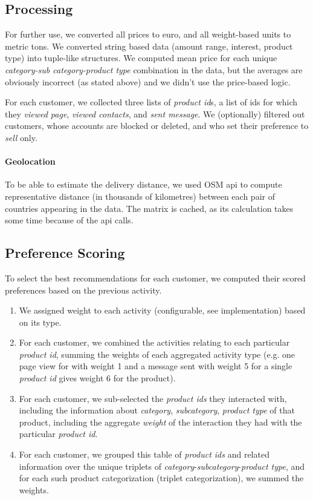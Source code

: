 \documentclass{report}
\begin{document}
\subsection*{Processing}

For further use, we converted all prices to euro, and all weight-based units to metric tons. We converted string
based data (amount range, interest, product type) into tuple-like structures. We computed mean price for each unique
\emph{category-sub category-product type} combination in the data, but the averages are obviously incorrect (as 
stated above) and we didn't use the price-based logic.

For each customer, we collected three lists of \emph{product id}s, a list of ids for which they \emph{viewed page},
\emph{viewed contacts}, and \emph{sent message}. We (optionally) filtered out customers, whose accounts are 
blocked or deleted, and who set their preference to \emph{sell} only.

\paragraph{Geolocation} To be able to estimate the delivery distance, we used OSM api to compute representative 
distance (in thousands of kilometres) between each pair of countries appearing in the data. The matrix is cached,
as its calculation takes some time because of the api calls.

\subsection*{Preference Scoring}

To select the best recommendations for each customer, we computed their scored preferences based on the previous 
activity.

\begin{enumerate}
	\item We assigned weight to each activity (configurable, see implementation) based on its type.
	\item For each customer, we combined the activities relating to each particular \emph{product id}, 
		summing the weights of each aggregated activity type (e.g. one page view for with weight 1 and a 
		message sent with weight 5 for a single \emph{product id} gives weight 6 for the product).
	\item For each customer, we sub-selected the \emph{product ids} they interacted with, including the
		information about \emph{category}, \emph{subcategory}, \emph{product type} of that product, 
		including the aggregate \emph{weight} of the interaction they had with the particular \emph{product id}.
	\item For each customer, we grouped this table of \emph{product ids} and related information over the 
		unique triplets of \emph{category}-\emph{subcategory}-\emph{product type}, and for each 
		such product categorization (triplet categorization), we summed the weights.
\end{enumerate}
\end{document}
